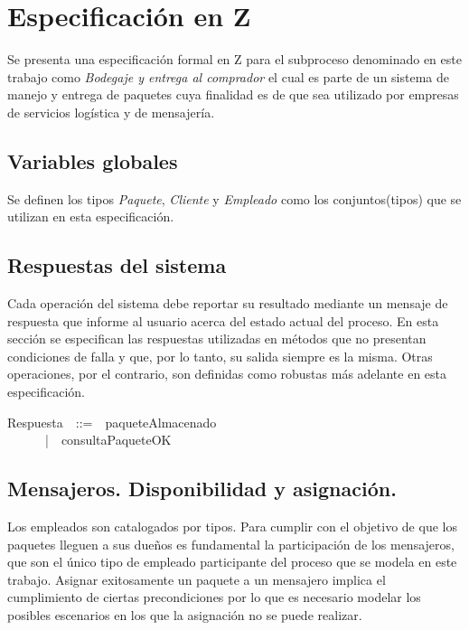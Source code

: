 \documentclass[12pt,a4paper,table]{article}
\begin{document}
\newpage
\section{Especificación en Z}

Se presenta una especificación formal en Z para el subproceso denominado en este trabajo como \textit{Bodegaje y entrega al comprador} el cual es parte de un sistema de manejo y entrega de paquetes cuya finalidad es de que sea utilizado por empresas de servicios logística y de mensajería.  

\subsection{Variables globales}
Se definen los tipos \textit{Paquete}, \textit{Cliente} y \textit{Empleado}  como los conjuntos(tipos) que se utilizan en esta especificación. 

\begin{zed}
\end{zed}

\subsection{Respuestas del sistema}

Cada operación del sistema debe reportar su resultado mediante un mensaje de respuesta que informe al usuario acerca del estado actual del proceso. En esta sección se especifican las respuestas utilizadas en métodos que no presentan condiciones de falla y que, por lo tanto, su salida siempre es la misma. Otras operaciones, por el contrario, son definidas como robustas más adelante en esta especificación.

\begin{zed}
Respuesta~~::=~~paqueteAlmacenado\\
~~~~~~|~~consultaPaqueteOK\\
\end{zed}

\subsection{Mensajeros. Disponibilidad y asignación.}
\indent Los empleados son catalogados por tipos. Para cumplir con el objetivo de que los paquetes lleguen a sus dueños es fundamental la participación de los mensajeros, que son el único tipo de empleado participante del proceso que se modela en este trabajo. Asignar exitosamente un paquete a un mensajero implica el cumplimiento de ciertas precondiciones por lo que es necesario modelar los posibles escenarios en los que la asignación no se puede realizar.
\end{document}
